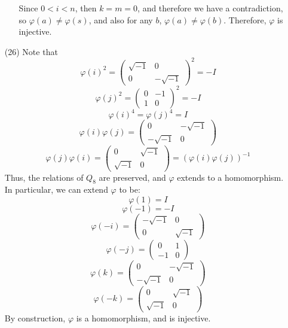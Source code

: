 \documentclass[12pt]{article}
\begin{document}
\begin{itemize}
\begin{itemize}
Since $0 < i < n$, then $k = m = 0$, and therefore we have a contradiction, so $\varphi(a) \neq \varphi(s)$, and also for any $b$, $\varphi(a) \neq \varphi(b)$.
Therefore, $\varphi$ is injective.
\end{itemize}
\item[(26)]
Note that
$$\varphi(i)^2 = \begin{pmatrix}
\sqrt{-1} & 0 \\
0 & -\sqrt{-1}
\end{pmatrix}^2 = -I$$
$$\varphi(j)^2 = \begin{pmatrix}
0 & -1 \\
1 & 0
\end{pmatrix}^2 = -I$$
$$\varphi(i)^4 = \varphi(j)^4 = I$$
$$\varphi(i)\varphi(j) = \begin{pmatrix}
0 & -\sqrt{-1} \\
-\sqrt{-1} & 0
\end{pmatrix}$$
$$\varphi(j)\varphi(i) = \begin{pmatrix}
0 & \sqrt{-1} \\
\sqrt{-1} & 0
\end{pmatrix} = (\varphi(i)\varphi(j))^{-1}$$
Thus, the relations of $Q_8$ are preserved, and $\varphi$ extends to a homomorphism. In particular, we can extend $\varphi$ to be:
$$\varphi(1) = I$$
$$\varphi(-1) = -I$$
$$\varphi(-i) = \begin{pmatrix}
-\sqrt{-1} & 0 \\
0 & \sqrt{-1}
\end{pmatrix}$$
$$\varphi(-j) = \begin{pmatrix}
0 & 1 \\
-1 & 0
\end{pmatrix}$$
$$\varphi(k) = \begin{pmatrix}
0 & -\sqrt{-1} \\
-\sqrt{-1} & 0
\end{pmatrix}$$
$$\varphi(-k) = \begin{pmatrix}
0 & \sqrt{-1} \\
\sqrt{-1} & 0
\end{pmatrix}$$
By construction, $\varphi$ is a homomorphism, and is injective.
\end{itemize}
\end{document}
